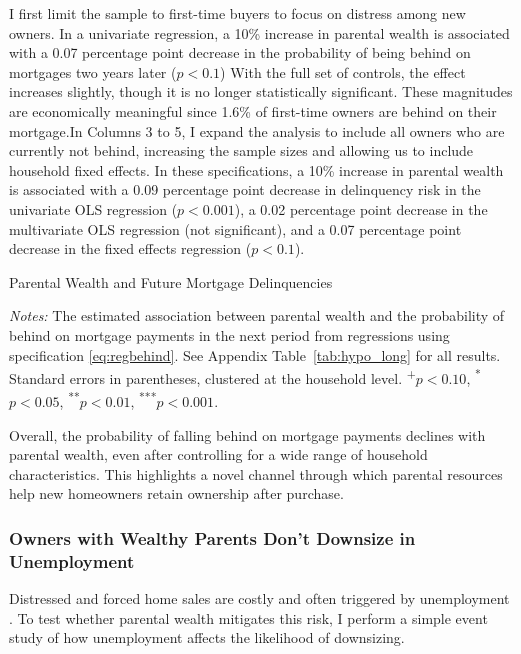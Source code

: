 \documentclass[12pt]{article}
\begin{document}
I first limit the sample to first-time buyers to focus on distress among new owners. In a univariate regression, a 10\% increase in parental wealth is associated with a 0.07 percentage point decrease in the probability of being behind on mortgages two years later ($p<0.1$) With the full set of controls, the effect increases slightly, though it is no longer statistically significant. These magnitudes are economically meaningful since 1.6\% of first-time owners are behind on their mortgage.In Columns 3 to 5, I expand the analysis to include all owners who are currently not behind, increasing the sample sizes and allowing us to include household fixed effects. In these specifications, a 10\% increase in parental wealth is associated with a 0.09 percentage point decrease in delinquency risk in the univariate OLS regression ($p<0.001$), a 0.02 percentage point decrease in the multivariate OLS regression (not significant), and a 0.07 percentage point decrease in the fixed effects regression ($p<0.1$).

\begin{table}
	\centering
	\begin{threeparttable}
		\caption{Parental Wealth and Future Mortgage Delinquencies}
		\label{tab:hypo}
		\small 
				
	
	\end{threeparttable}
	{\begin{footnotesize}\begin{flushleft}
		\textit{Notes:} The estimated association between parental wealth and the probability of behind on mortgage payments in the next period from regressions using specification \ref{eq:regbehind}. See Appendix Table~\ref{tab:hypo_long} for all results. Standard errors in parentheses, clustered at the household level. \textsuperscript{+}$p<0.10$, \textsuperscript{*}$p<0.05$, \textsuperscript{**}$p<0.01$, \textsuperscript{***}$p<0.001$.
		\end{flushleft}\end{footnotesize}}	
\end{table}

Overall, the probability of falling behind on mortgage payments declines with parental wealth, even after controlling for a wide range of household characteristics. This highlights a novel channel through which parental resources help new homeowners retain ownership after purchase.


\subsubsection{Owners with Wealthy Parents Don't Downsize in Unemployment}\label{sec:eventstudy}
Distressed and forced home sales are costly and often triggered by unemployment \citep{kermani2021racial,hsu2018unemployment}. To test whether parental wealth mitigates this risk, I perform a simple event study of how unemployment affects the likelihood of downsizing.
\end{document}
